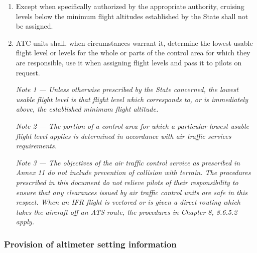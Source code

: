 \documentclass[../main.tex]{subfiles}
\begin{document}
    \begin{enumerate}
        \item Except when specifically authorized by the appropriate authority, cruising levels below the minimum flight altitudes established by the State shall not be assigned.
        \item \label{4.10.3.2} ATC units shall, when circumstances warrant it, determine the lowest usable flight level or levels for the whole or parts of the control area for which they are responsible, use it when assigning flight levels and pass it to pilots on request.

        \textit{Note 1 --- Unless otherwise prescribed by the State concerned, the lowest usable flight level is that flight level which corresponds to, or is immediately above, the established minimum flight altitude.}

        \textit{Note 2 --- The portion of a control area for which a particular lowest usable flight level applies is determined in accordance with air traffic services requirements.}

        \textit{Note 3 --- The objectives of the air traffic control service as prescribed in Annex 11 do not include prevention of collision with terrain. The procedures prescribed in this document do not relieve pilots of their responsibility to ensure that any clearances issued by air traffic control units are safe in this respect. When an IFR flight is vectored or is given a direct routing which takes the aircraft off an ATS route, the procedures in Chapter 8, 8.6.5.2 apply.}
    \end{enumerate}

    \subsubsection{Provision of altimeter setting information}
\end{document}
